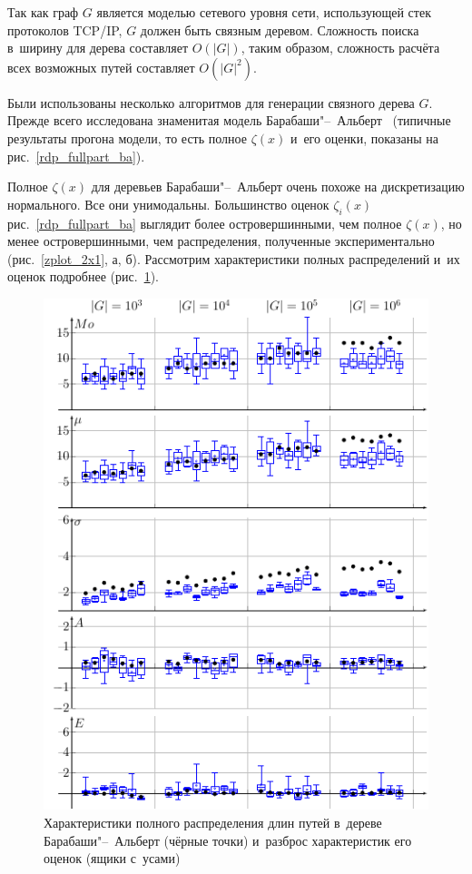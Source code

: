 \documentclass[10pt, a5paper]{article}
\begin{document}
Так как  граф $G$ является моделью сетевого уровня сети, использующей стек протоколов TCP/IP,
$G$ должен быть связным деревом.
Сложность поиска в~ширину для дерева составляет $O(|G|)$, таким образом, сложность расчёта всех возможных путей составляет $O(|G|^2)$.


Были использованы несколько алгоритмов для генерации связного дерева $G$.
Прежде всего исследована знаменитая модель Барабаши"--~Альберт~\cite{ba} (типичные результаты прогона модели, то есть полное $\zeta(x)$ и~его оценки, показаны на рис.~\ref{rdp_fullpart_ba}).

Полное $\zeta(x)$ для деревьев Барабаши"--~Альберт очень похоже на дискретизацию нормального.
Все они унимодальны.
Большинство оценок $\zeta_i(x)$ рис.~\ref{rdp_fullpart_ba} выглядит более островершинными, чем полное $\zeta(x)$, но менее островершинными, чем распределения, полученные экспериментально (рис.~\ref{zplot_2x1}, а, б).
Рассмотрим характеристики полных распределений и~их оценок подробнее (рис.~\ref{5_moments_ba}).

\begin{figure}[p]
  \centering
  \includegraphics[width=\linewidth]{2019_miet_kai_gav_5_moments_ba}
\caption{Характеристики полного  распределения длин путей в~дереве  Барабаши"--~Альберт (чёрные точки) и~разброс характеристик  его оценок (ящики с~усами)}
\label{5_moments_ba}
\end{figure}
\end{document}
